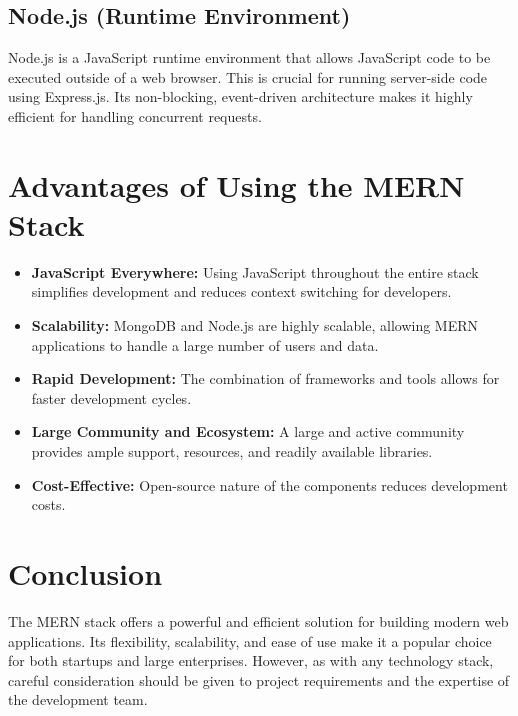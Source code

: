 \documentclass{article}
\begin{document}
\subsection{Node.js (Runtime Environment)}

Node.js is a JavaScript runtime environment that allows JavaScript code to be executed outside of a web browser.  This is crucial for running server-side code using Express.js.  Its non-blocking, event-driven architecture makes it highly efficient for handling concurrent requests.


\section{Advantages of Using the MERN Stack}

\begin{itemize}
    \item \textbf{JavaScript Everywhere:}  Using JavaScript throughout the entire stack simplifies development and reduces context switching for developers.
    \item \textbf{Scalability:}  MongoDB and Node.js are highly scalable, allowing MERN applications to handle a large number of users and data.
    \item \textbf{Rapid Development:}  The combination of frameworks and tools allows for faster development cycles.
    \item \textbf{Large Community and Ecosystem:}  A large and active community provides ample support, resources, and readily available libraries.
    \item \textbf{Cost-Effective:}  Open-source nature of the components reduces development costs.
\end{itemize}


\section{Conclusion}

The MERN stack offers a powerful and efficient solution for building modern web applications.  Its flexibility, scalability, and ease of use make it a popular choice for both startups and large enterprises.  However, as with any technology stack, careful consideration should be given to project requirements and the expertise of the development team.
\end{document}
